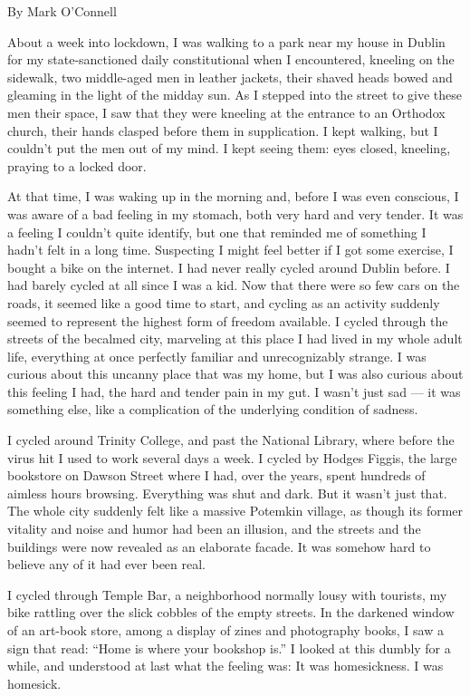 By Mark O'Connell

About a week into lockdown, I was walking to a park near my house in
Dublin for my state-sanctioned daily constitutional when I encountered,
kneeling on the sidewalk, two middle-aged men in leather jackets, their
shaved heads bowed and gleaming in the light of the midday sun. As I
stepped into the street to give these men their space, I saw that they
were kneeling at the entrance to an Orthodox church, their hands clasped
before them in supplication. I kept walking, but I couldn't put the men
out of my mind. I kept seeing them: eyes closed, kneeling, praying to a
locked door.

At that time, I was waking up in the morning and, before I was even
conscious, I was aware of a bad feeling in my stomach, both very hard
and very tender. It was a feeling I couldn't quite identify, but one
that reminded me of something I hadn't felt in a long time. Suspecting I
might feel better if I got some exercise, I bought a bike on the
internet. I had never really cycled around Dublin before. I had barely
cycled at all since I was a kid. Now that there were so few cars on the
roads, it seemed like a good time to start, and cycling as an activity
suddenly seemed to represent the highest form of freedom available. I
cycled through the streets of the becalmed city, marveling at this place
I had lived in my whole adult life, everything at once perfectly
familiar and unrecognizably strange. I was curious about this uncanny
place that was my home, but I was also curious about this feeling I had,
the hard and tender pain in my gut. I wasn't just sad --- it was
something else, like a complication of the underlying condition of
sadness.

I cycled around Trinity College, and past the National Library, where
before the virus hit I used to work several days a week. I cycled by
Hodges Figgis, the large bookstore on Dawson Street where I had, over
the years, spent hundreds of aimless hours browsing. Everything was shut
and dark. But it wasn't just that. The whole city suddenly felt like a
massive Potemkin village, as though its former vitality and noise and
humor had been an illusion, and the streets and the buildings were now
revealed as an elaborate facade. It was somehow hard to believe any of
it had ever been real.

I cycled through Temple Bar, a neighborhood normally lousy with
tourists, my bike rattling over the slick cobbles of the empty streets.
In the darkened window of an art-book store, among a display of zines
and photography books, I saw a sign that read: ``Home is where your
bookshop is.'' I looked at this dumbly for a while, and understood at
last what the feeling was: It was homesickness. I was homesick.

